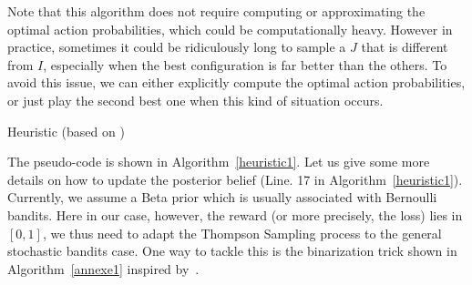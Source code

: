 \documentclass[twoside,11pt]{article}
\begin{document}
\begin{remark}
Note that this algorithm does not require computing or approximating the optimal action probabilities, which could be computationally heavy. However in practice, sometimes it could be ridiculously long to sample a $J$ that is different from $I$, especially when the best configuration is far better than the others. To avoid this issue, we can either explicitly compute the optimal action probabilities, or just play the second best one when this kind of situation occurs.
\end{remark}

\begin{algorithm}[h]

\caption{Heuristic (based on \TTTS)\label{heuristic1}}
\end{algorithm}

The pseudo-code is shown in Algorithm~\ref{heuristic1}. Let us give some more details on how to update the posterior belief (Line. 17 in Algorithm~\ref{heuristic1}). Currently, we assume a Beta prior which is usually associated with Bernoulli bandits. Here in our case, however, the reward (or more precisely, the loss) lies in $[0, 1]$, we thus need to adapt the Thompson Sampling process to the general stochastic bandits case. One way to tackle this is the binarization trick shown in Algorithm~\ref{annexe1} inspired by~\cite{agrawal2012}. 
\end{document}
